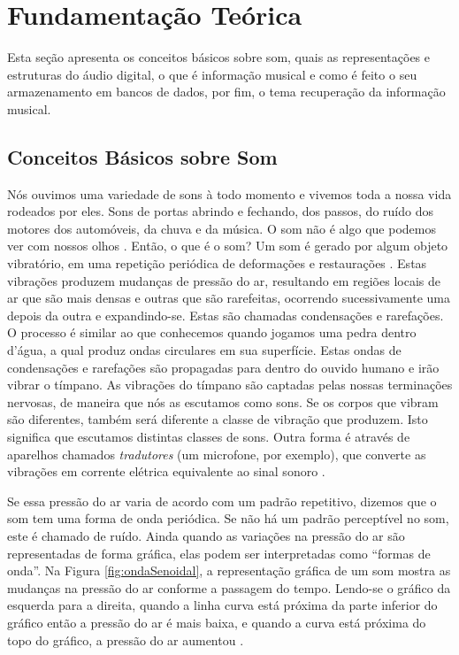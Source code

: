 \chapter{Fundamentação Teórica} \label{cap:fundamentacao-teorica}
Esta seção apresenta os conceitos básicos sobre som, quais as representações e estruturas do áudio digital, o que é informação musical e como é feito o seu armazenamento em bancos de dados, por fim, o tema recuperação da informação musical.

\section{Conceitos Básicos sobre Som} \label{sec:conceitoSom}
Nós ouvimos uma variedade de sons à todo momento e vivemos toda a nossa vida rodeados por eles. Sons de portas abrindo e fechando, dos passos, do ruído dos motores dos automóveis, da chuva e da música. O som não é algo que podemos ver com nossos olhos \cite{miletto2004}. Então, o que é o som? 
Um som é gerado por algum objeto vibratório, em uma repetição periódica de deformações e restaurações \cite{muller2007}. Estas vibrações produzem mudanças de pressão do ar, resultando em regiões locais de ar que são mais densas e outras que são rarefeitas, ocorrendo sucessivamente uma depois da outra e expandindo-se. Estas são chamadas condensações e rarefações. O processo é similar ao que conhecemos quando jogamos uma pedra dentro d’água, a qual produz ondas circulares em sua superfície. Estas ondas de condensações e rarefações são propagadas para dentro do ouvido humano e irão vibrar o tímpano. As vibrações do tímpano são captadas pelas nossas terminações nervosas, de maneira que nós as escutamos como sons. Se os corpos que vibram são diferentes, também será diferente a classe de vibração que produzem. Isto significa que escutamos distintas classes de sons.
Outra forma é através de aparelhos chamados \textit{tradutores} (um microfone, por exemplo), que converte as vibrações em corrente elétrica equivalente ao sinal sonoro \cite{paulozuben2004}.

Se essa pressão do ar varia de acordo com um padrão repetitivo, dizemos que o som tem uma forma de onda periódica. Se não há um padrão perceptível no som, este é chamado de ruído. Ainda quando as variações na pressão do ar são representadas de forma gráfica, elas podem ser interpretadas como “formas de onda”. Na Figura \ref{fig:ondaSenoidal}, a representação gráfica de um som mostra as mudanças na pressão do ar conforme a passagem do tempo. Lendo-se o gráfico da esquerda para a direita, quando a linha curva está próxima da parte inferior do gráfico então a pressão do ar é mais baixa, e quando a curva está próxima do topo do gráfico, a pressão do ar aumentou \cite{miletto2004}.

